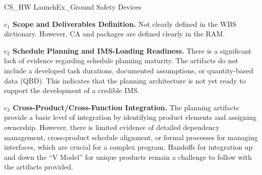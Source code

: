 \begin{frame}{CS\_HW LaunchEx\_Ground Safety Devices}
\begin{minipage}{0.90\textwidth}
\raggedright
\fontsize{8}{9.5}\selectfont
\textbf{\(c_1\) Scope and Deliverables Definition.}
Not clearly defined in the WBS dictionary. However, CA and packages are defined clearly in the RAM.\par\vspace{0.6em}
\textbf{\(c_2\) Schedule Planning and IMS-Loading Readiness.}
There is a significant lack of evidence regarding schedule planning maturity. The artifacts do not include a developed task durations, documented assumptions, or quantity-based data (QBD). This indicates that the planning architecture is not yet ready to support the development of a credible IMS.\par\vspace{0.6em}
\textbf{\(c_3\) Cross-Product/Cross-Function Integration.}
The planning artifacts provide a basic level of integration by identifying product elements and assigning ownership. However, there is limited evidence of detailed dependency management, cross-product schedule alignment, or formal processes for managing interfaces, which are crucial for a complex program. Handoffs for integration up and down the “V Model” for unique products remain a challenge to follow with the artifacts provided.\par\vspace{0.6em}
\end{minipage}
\end{frame}

\endinput
